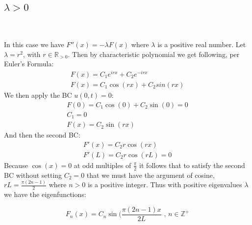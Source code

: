 \documentclass{article}
\begin{document}
\subsection*{\underline{$\lambda > 0$}}~\\
\\
In this case we have $F''(x) = -\lambda F(x)$ where $\lambda$ is a positive real number. Let $\lambda = r^2$, with $r \in \mathbb{R}_{>0}$. Then by characteristic polynomial we get following, per Euler's Formula:
\begin{equation}
\begin{aligned}
F(x) = C_1e^{irx} + C_2e^{-irx}\\
F(x) = C_1\cos(rx)+C_2sin(rx)
\end{aligned}
\end{equation}
We then apply the BC $u(0,t) = 0$:
\begin{equation}
\begin{aligned}
F(0) = C_1\cos(0) + C_2\sin(0) = 0\\
C_1 = 0\\
F(x) = C_2\sin(rx)
\end{aligned}
\end{equation}
And then the second BC:
\begin{equation}
\begin{aligned}
F'(x) = C_2r\cos(rx)\\
F'(L) = C_2r\cos(rL) = 0
\end{aligned}
\end{equation}
Because $\cos(x) = 0$ at odd multiples of $\frac{\pi}{2}$ it follows that to satisfy the second BC without setting $C_2 = 0$ that we must have the argument of cosine, $rL = \frac{\pi(2n-1)}{2}$ where $n > 0$ is a positive integer. Thus with positive eigenvalues $\lambda$ we have the eigenfunctions:
\begin{tcolorbox}[minipage,colback=white,arc=0pt,outer arc=0pt]
\begin{equation}
F_n(x) = C_n\sin(\frac{\pi(2n-1)x}{2L} \text{ , } n \in \mathbb{Z}^+
\end{equation}
\end{tcolorbox}
\end{document}
